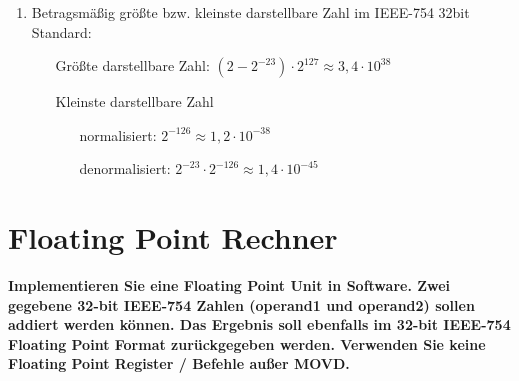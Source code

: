 \documentclass[11pt]{article}
\newcommand{\aufgabe}[1]{\item{\bf #1}}
\begin{document}
\begin{enumerate}
    \item Betragsmäßig größte bzw. kleinste darstellbare Zahl im IEEE-754 32bit Standard:
    \begin{enumerate}
        \item[Größte darstellbare] Zahl: $(2-2^{-23}) \cdot 2^{127} \approx 3,4·10^{38}$
        \item[Kleinste darstellbare] Zahl
        \begin{enumerate}
            \item[normalisiert:] $2^{-126} \approx 1,2·10^{-38}$
            \item[denormalisiert:] $2^{-23} \cdot 2^{-126} \approx 1,4·10^{-45}$
        \end{enumerate}
    \end{enumerate}
\end{enumerate}


\section{Floating Point Rechner}
\aufgabe{Implementieren Sie eine Floating Point Unit in Software. Zwei gegebene 32-bit IEEE-754 Zahlen (operand1 und operand2) sollen addiert werden können. Das Ergebnis soll ebenfalls im 32-bit IEEE-754 Floating Point Format zurückgegeben werden. Verwenden Sie keine Floating Point Register / Befehle außer MOVD.}


\end{document}
